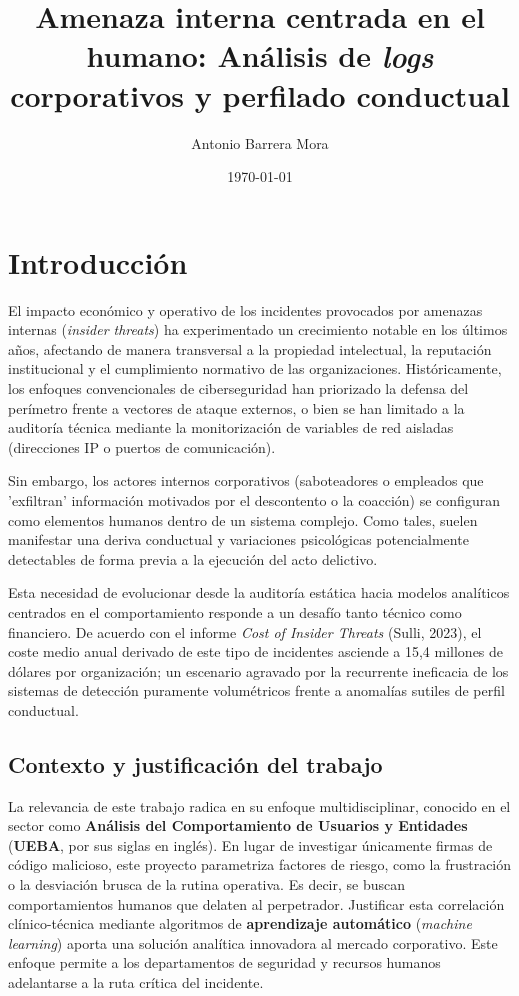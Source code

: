\documentclass[IB]{TFUOC}%
\title{Amenaza interna centrada en el humano: Análisis de \textit{logs} corporativos y perfilado conductual}
\author{Antonio Barrera Mora}
\date{\today}
\begin{document}
\estructura

\tableofcontents

\listoffigures

\listoftables




\chapter{Introducción}

El impacto económico y operativo de los incidentes provocados por amenazas internas (\textit{insider threats}) ha experimentado un crecimiento notable en los últimos años, afectando de manera transversal a la propiedad intelectual, la reputación institucional y el cumplimiento normativo de las organizaciones. Históricamente, los enfoques convencionales de ciberseguridad han priorizado la defensa del perímetro frente a vectores de ataque externos, o bien se han limitado a la auditoría técnica mediante la monitorización de variables de red aisladas (direcciones IP o puertos de comunicación). 

\medskip
\noindent Sin embargo, los actores internos corporativos (saboteadores o empleados que 'exfiltran' información motivados por el descontento o la coacción) se configuran como elementos humanos dentro de un sistema complejo. Como tales, suelen manifestar una deriva conductual y variaciones psicológicas potencialmente detectables de forma previa a la ejecución del acto delictivo. 

\medskip
\noindent Esta necesidad de evolucionar desde la auditoría estática hacia modelos analíticos centrados en el comportamiento responde a un desafío tanto técnico como financiero. De acuerdo con el informe \textit{Cost of Insider Threats} (Sulli, 2023), el coste medio anual derivado de este tipo de incidentes asciende a 15,4 millones de dólares por organización; un escenario agravado por la recurrente ineficacia de los sistemas de detección puramente volumétricos frente a anomalías sutiles de perfil conductual.

\section{Contexto y justificación del trabajo}

La relevancia de este trabajo radica en su enfoque multidisciplinar, conocido en el sector como \textbf{Análisis del Comportamiento de Usuarios y Entidades} (\textbf{UEBA}, por sus siglas en inglés). En lugar de investigar únicamente firmas de código malicioso, este proyecto parametriza factores de riesgo, como la frustración o la desviación brusca de la rutina operativa. Es decir, se buscan comportamientos humanos que delaten al perpetrador. Justificar esta correlación clínico-técnica mediante algoritmos de \textbf{aprendizaje automático} (\textit{machine learning}) aporta una solución analítica innovadora al mercado corporativo. Este enfoque permite a los departamentos de seguridad y recursos humanos adelantarse a la ruta crítica del incidente.
\end{document}
